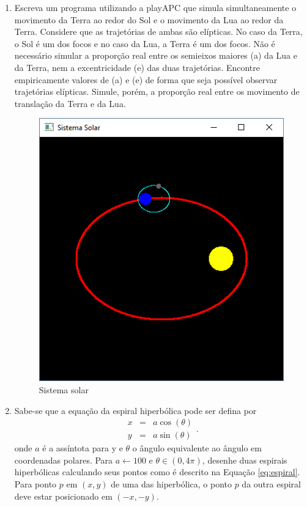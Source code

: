 \begin{enumerate}
\item
  Escreva um programa utilizando a playAPC que simula simultaneamente o movimento da Terra ao redor do Sol e o movimento da Lua ao redor da Terra. Considere que as trajetórias de ambas são elípticas. No caso da Terra, o Sol é um dos focos e no caso da Lua, a Terra é um dos focos. Não é necessário simular a proporção real entre os semieixos maiores (a) da Lua e da Terra, nem a excentricidade (e) das duas trajetórias. Encontre empiricamente valores de (a) e (e) de forma que seja possível observar trajetórias elípticas. Simule, porém, a proporção real entre os movimento de translação da Terra e da Lua.
  \label{ex:cap01_ex24}

  \begin{figure}[H]
    \centerline{\includegraphics[width=.5\textwidth]{img/cap1_ex24.png}}
    \caption{Sistema solar}
    \label{fig:cap01_ex24}
  \end{figure}

\item
  Sabe-se que a equação da espiral hiperbólica pode ser defina por
\begin{equation} \label{eq:espiral}
  \begin{matrix}
  x	& = &	a \cos(\theta) \\ 
  y	& = &	a \sin(\theta)
  \end{matrix}.
\end{equation}
  onde $a$ é a assíntota para y e $\theta$ o ângulo equivalente ao ângulo em coordenadas polares. Para $a \gets 100$ e $\theta \in (0, 4\pi)$, desenhe duas espirais hiperbólicas calculando seus pontos como é descrito na Equação \ref{eq:espiral}. Para ponto $p$ em $(x,y)$ de uma das hiperbólica, o ponto $p$ da outra espiral deve estar posicionado em $(-x,-y)$.

  \label{ex:cap01_ex5}


\end{enumerate}
